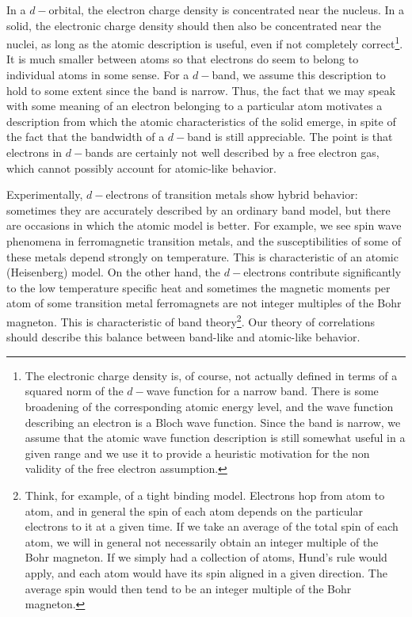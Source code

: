 In a $d-$orbital, the electron charge density is concentrated near the nucleus.
In a solid, the electronic charge density should then also be concentrated near the nuclei, as long as the atomic description is useful, even if not completely correct\footnote{The electronic charge density is, of course, not actually defined in terms of a squared norm of the $d-$wave function for a narrow band. There is some broadening of the corresponding atomic energy level, and the wave function describing an electron is a Bloch wave function. Since the band is narrow, we assume that the atomic wave function description is still somewhat useful in a given range and we use it to provide a heuristic motivation for the non validity of the free electron assumption.}.
It is much smaller between atoms so that electrons do seem to belong to individual atoms in some sense.
For a $d-$band, we assume this description to hold to some extent since the band is narrow.
Thus, the fact that we may speak with some meaning of an electron belonging to a particular atom motivates a description from which the atomic characteristics of the solid emerge, in spite of the fact that the bandwidth of a $d-$band is still appreciable.
The point is that electrons in $d-$bands are certainly not well described by a free electron gas, which cannot possibly account for atomic-like behavior.

Experimentally, $d-$electrons of transition metals show hybrid behavior: sometimes they are accurately described by an ordinary band model, but there are occasions in which the atomic model is better.
For example, we see spin wave phenomena in ferromagnetic transition metals, and the susceptibilities of some of these metals depend strongly on temperature.
This is characteristic of an atomic (Heisenberg) model.
On the other hand, the $d-$electrons contribute significantly to the low temperature specific heat and sometimes the magnetic moments per atom of some transition metal ferromagnets are not integer multiples of the Bohr magneton.
This is characteristic of band theory\footnote{Think, for example, of a tight binding model. Electrons hop from atom to atom, and in general the spin of each atom depends on the particular electrons  to it at a given time. If we take an average of the total spin of each atom, we will in general not necessarily obtain an integer multiple of the Bohr magneton. If we simply had a collection of atoms, Hund's rule would apply, and each atom would have its spin aligned in a given direction. The average spin would then tend to be an integer multiple of the Bohr magneton.}.
Our theory of correlations should describe this balance between band-like and atomic-like behavior.

